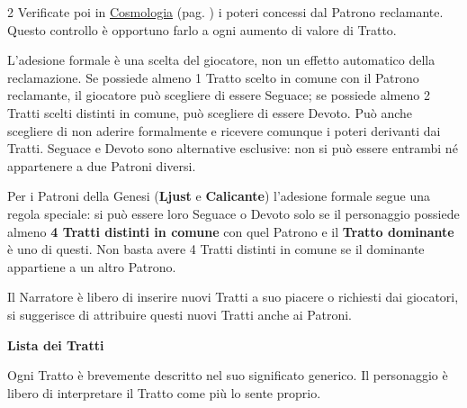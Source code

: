 \begin{multicols}{2}
Verificate poi in \hyperlink{cosmologia}{Cosmologia} (pag. \pageref{patroni}) i poteri concessi dal Patrono reclamante. Questo controllo è opportuno farlo a ogni aumento di valore di Tratto.

L'adesione formale è una scelta del giocatore, non un effetto automatico della reclamazione. Se possiede almeno 1 Tratto scelto in comune con il Patrono reclamante, il giocatore può scegliere di essere Seguace; se possiede almeno 2 Tratti scelti distinti in comune, può scegliere di essere Devoto. Può anche scegliere di non aderire formalmente e ricevere comunque i poteri derivanti dai Tratti. Seguace e Devoto sono alternative esclusive: non si può essere entrambi né appartenere a due Patroni diversi.

Per i Patroni della Genesi (\textbf{Ljust} e \textbf{Calicante}) l'adesione formale segue una regola speciale: si può essere loro Seguace o Devoto solo se il personaggio possiede almeno \textbf{4 Tratti distinti in comune} con quel Patrono e il \textbf{Tratto dominante} è uno di questi. Non basta avere 4 Tratti distinti in comune se il dominante appartiene a un altro Patrono.

Il Narratore è libero di inserire nuovi Tratti a suo piacere o richiesti dai giocatori, si suggerisce di attribuire questi nuovi Tratti anche ai Patroni.

\medskip

\textbf{Lista dei Tratti}

Ogni Tratto è brevemente descritto nel suo significato generico. Il personaggio è libero di interpretare il Tratto come più lo sente proprio.

\medskip


\end{multicols}
